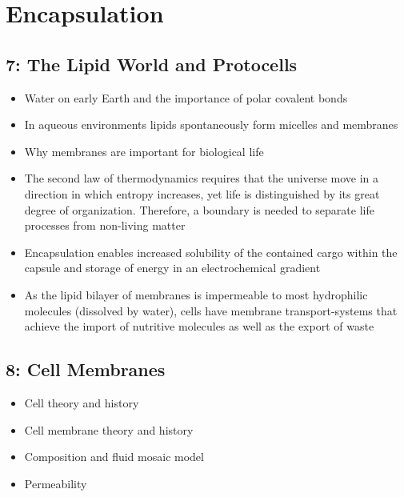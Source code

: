\documentclass[
]{report}
\providecommand{\tightlist}{%
  \setlength{\itemsep}{0pt}\setlength{\parskip}{0pt}}
\providecommand{\tightlist}{%
  \setlength{\itemsep}{0pt}\setlength{\parskip}{0pt}}
\begin{document}
\hypertarget{encapsulation}{%
\chapter{Encapsulation}\label{encapsulation}}

\hypertarget{the-lipid-world-and-protocells}{%
\section*{7: The Lipid World and Protocells}\label{the-lipid-world-and-protocells}}

\begin{itemize}
\tightlist
\item
  Water on early Earth and the importance of polar covalent bonds
\item
  In aqueous environments lipids spontaneously form micelles and membranes
\item
  Why membranes are important for biological life
\item
  The second law of thermodynamics requires that the universe move in a direction in which entropy increases, yet life is distinguished by its great degree of organization. Therefore, a boundary is needed to separate life processes from non-living matter
\item
  Encapsulation enables increased solubility of the contained cargo within the capsule and storage of energy in an electrochemical gradient
\item
  As the lipid bilayer of membranes is impermeable to most hydrophilic molecules (dissolved by water), cells have membrane transport-systems that achieve the import of nutritive molecules as well as the export of waste
\end{itemize}

\hypertarget{cell-membranes}{%
\section*{8: Cell Membranes}\label{cell-membranes}}

\begin{itemize}
\tightlist
\item
  Cell theory and history
\item
  Cell membrane theory and history
\item
  Composition and fluid mosaic model
\item
  Permeability
\end{itemize}
\end{document}
